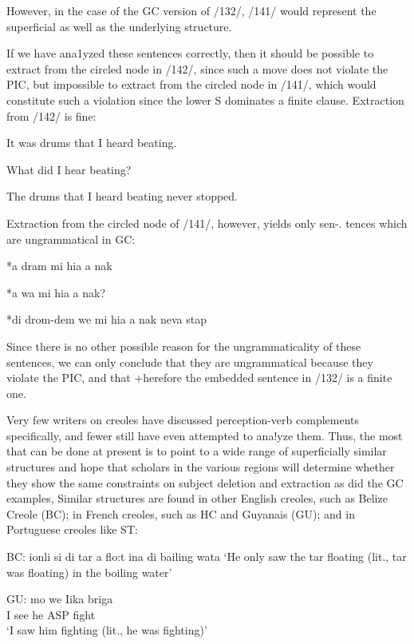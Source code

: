 However, in the case of the GC version of /132/, /141/ would represent the superficial as well as the underlying structure.

If we have ana1yzed these sentences correctly, then it should be
possible to extract from the circled node in /142/, since such a move does not violate the PIC, but impossible to extract from the circled node in /141/, which would constitute such a violation since the lower S dominates a finite clause. Extraction from /142/ is fine:

\ea\label{ex:2:143}
 It was drums that I heard beating.
\z

\ea\label{ex:2:144}
 What did I hear beating?
\z

\ea\label{ex:2:145}
 The drums that I heard beating never stopped.
\z

Extraction from the circled node of /141/, however, yields only sen{}-. tences which are ungrammatical in GC:

\ea\label{ex:2:146}
 *a dram mi hia a nak
\z

\ea\label{ex:2:147}
 *a wa mi hia a nak?
\z

\ea\label{ex:2:148}
 *di drom-dem we mi hia a nak neva stap
\z

Since there is no other possible reason for the ungrammaticality of these sentences, we can only conclude that they are ungrammatical because they violate the PIC, and that +herefore the embedded sentence in /132/ is a finite one.


Very few writers on creoles have discussed perception-verb com\-plements specifically, and fewer still have even attempted to ana!yze them. Thus, the most that can be done at present is to point to a wide range of superficially similar structures and hope that scholars in the various regions will determine whether they show the same constraints on subject deletion and extraction as did the GC examples, Similar structures are found in other English creoles, such as Belize Creole (BC); in French creoles, such as HC and Guyanais (GU); and in Portu\-guese creoles like ST:

\ea\label{ex:2:149}
 BC: ionli si di tar a flo:t ina di bailing wata
\glt `He only saw the tar floating (lit., tar was floating) in the boiling water'
\z



\ea\label{ex:2:150}
 \gll GU: mo we Iika briga\\
I see he ASP fight\\
\glt `I saw him fighting (lit., he was fighting)'
\z





